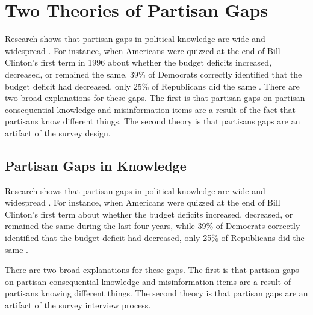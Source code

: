 \documentclass[12pt, letterpaper]{article}
\begin{document}
\section*{Two Theories of Partisan Gaps}

Research shows that partisan gaps in political knowledge are wide and widespread \citep{bartels_2002, jerit2012partisan, lodgetaber_2013}. For instance, when Americans were quizzed at the end of Bill Clinton's first term in 1996 about whether the budget deficits increased, decreased, or remained the same, 39\% of Democrats correctly identified that the budget deficit had decreased, only 25\% of Republicans did the same \citep[280]{achen2016democracy}. There are two broad explanations for these gaps. The first is that partisan gaps on partisan consequential knowledge and misinformation items are a result of the fact that partisans know different things. The second theory is that partisans gaps are an artifact of the survey design.


\subsection*{Partisan Gaps in Knowledge}
Research shows that partisan gaps in political knowledge are wide and widespread \citep{bartels_2002, jerit2012partisan, lodgetaber_2013}. For instance, when Americans were quizzed at the end of Bill Clinton's first term about whether the budget deficits increased, decreased, or remained the same during the last four years, while 39\% of Democrats correctly identified that the budget deficit had decreased, only 25\% of Republicans did the same \citep[280]{achen2016democracy}. 

There are two broad explanations for these gaps. The first is that partisan gaps on partisan consequential knowledge and misinformation items are a result of partisans knowing different things. The second theory is that partisan gaps are an artifact of the survey interview process.
\end{document}
